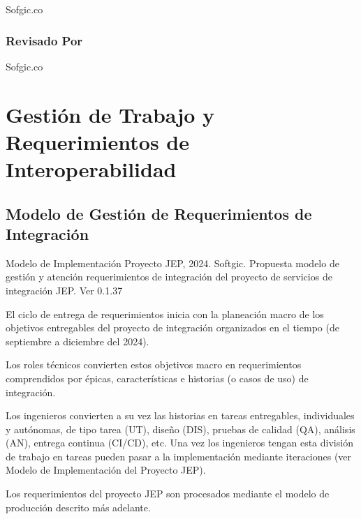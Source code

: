 \documentclass[
  paper=a4,
  ,captions=tableheading
]{scrartcl}
\renewenvironment{quote}{\begin{customblockquote}\list{}{\rightmargin=0em\leftmargin=0em}%
\item\relax\color{blockquote-text}\ignorespaces}{\unskip\unskip\endlist\end{customblockquote}}
\begin{document}
Sofgic.co

\subsubsection{Revisado Por}\label{sec:revisado-por}

Sofgic.co

\newpage

\section{Gestión de Trabajo y Requerimientos de
Interoperabilidad}\label{sec:gestiuxf3n-de-trabajo-y-requerimientos-de-interoperabilidad}

\subsection{Modelo de Gestión de Requerimientos de
Integración}\label{sec:modelo-de-gestiuxf3n-de-requerimientos-de-integraciuxf3n}

\begin{quote}
Modelo de Implementación Proyecto JEP, 2024. Softgic. Propuesta modelo
de gestión y atención requerimientos de integración del proyecto de
servicios de integración JEP. Ver 0.1.37
\end{quote}

El ciclo de entrega de requerimientos inicia con la planeación macro de
los objetivos entregables del proyecto de integración organizados en el
tiempo (de septiembre a diciembre del 2024).

Los roles técnicos convierten estos objetivos macro en requerimientos
comprendidos por épicas, características e historias (o casos de uso) de
integración.

Los ingenieros convierten a su vez las historias en tareas entregables,
individuales y autónomas, de tipo tarea (UT), diseño (DIS), pruebas de
calidad (QA), análisis (AN), entrega continua (CI/CD), etc. Una vez los
ingenieros tengan esta división de trabajo en tareas pueden pasar a la
implementación mediante iteraciones (ver Modelo de Implementación del
Proyecto JEP).

Los requerimientos del proyecto JEP son procesados mediante el modelo de
producción descrito más adelante.
\end{document}
